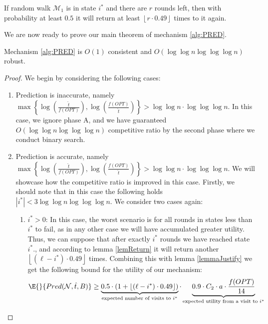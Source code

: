 \begin{lemma}\label{lemReturn}
    If random walk $\mathcal{M}_1$ is in state $i^{*}$ and there are $r$ rounds left, then with probability at least $0.5$ it will return at least $\left\lfloor r\cdot 0.49\right\rfloor$ times to it again.
\end{lemma}
We are now ready to prove our main theorem of mechanism \ref{alg:PRED}.

\begin{theorem}
    Mechanism \ref{alg:PRED} is $O(1)$ consistent and $O(\log\log n\log\log\log n)$ robust.
\end{theorem}
\begin{proof}
    We begin by considering the following cases:
    \begin{enumerate}
        \item Prediction is inaccurate, namely $\max\left\{ \log \left(\frac{\hat{t}}{f(OPT)}\right),\log\left (\frac{f(OPT)}{\hat{t}}\right)\right\} > \log\log n \cdot \log\log\log n $. In this case, we ignore phase A, and we have guaranteed $O(\log\log n \log\log\log n)$  competitive ratio by the second phase where we conduct binary search.
        \item Prediction is accurate, namely $\max\left\{ \log \left(\frac{\hat{t}}{f(OPT)}\right),\log\left (\frac{f(OPT)}{\hat{t}}\right)\right\} > \log\log n \cdot \log\log\log n $. We will showcase how the competitive ratio is improved in this case. Firstly, we should note that in this case the following holds $|i^{*}|<3\log\log n \log\log\log n$. We consider two cases again:
        \begin{enumerate}
            \item $i^* > 0$:
             In this case, the worst scenario is for all rounds in  states  less than $i^*$ to fail, as in any other case we will have accumulated greater utility. Thus, we can suppose that after exactly $i^*$ rounds we have reached  state $i^*$., and according to lemma \ref{lemReturn} it will return another $\left\lfloor (\ell - i^*)\cdot 0.49\right\rfloor$ times. Combining this with lemma \ref{lemmaJustify} we get the following bound for the utility of our mechanism:
            \begin{equation}
                \begin{split}
                    \E{}{Pred(\mathcal{N},\hat{t},B)} \ge \underbrace{0.5 \cdot (1+\left\lfloor (\ell - i^*)\cdot 0.49\right\rfloor )}_{\text{expected number of visits to } i^*}\cdot \underbrace{0.9 \cdot C_2 \cdot a \cdot \frac{f(OPT)}{14}}_{\text{expected utility from a visit to }i^*}

\end{split}
\end{equation}
\end{enumerate}
\end{enumerate}
\end{proof}
